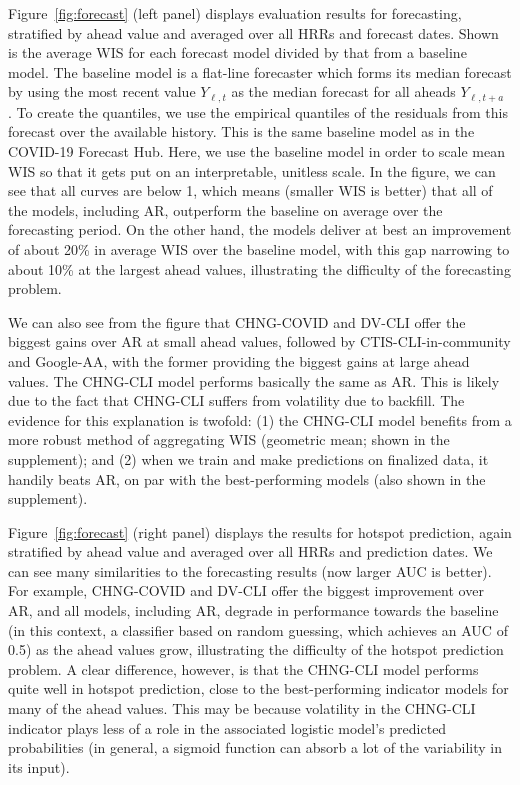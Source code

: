 \documentclass[9pt,twocolumn,twoside,lineno]{pnas-new}
\begin{document}
Figure~\ref{fig:forecast} (left panel) displays evaluation results for
forecasting, stratified by ahead value and averaged over all HRRs and forecast
dates.  Shown is the average WIS for each forecast model divided by that from a
baseline model.
The baseline model is a flat-line forecaster which forms its median forecast by
using the most recent value $Y_{\ell,t}$ as the median forecast for all aheads
$Y_{\ell,t+a}$ . To create
the quantiles, we use the empirical quantiles of the residuals from this
forecast over the available history. 
This is the same baseline model as
in the COVID-19 Forecast Hub. Here, we use the baseline model in order to scale
mean WIS so that it gets put on an interpretable, unitless scale.  In the
figure, we can see that all curves are below 1, which means (smaller WIS is
better) that all of the models, including AR, outperform the baseline on average
over the forecasting period.  On the other hand, the models deliver at best an
improvement of about 20\% in average WIS over the baseline model, with this gap
narrowing to about 10\% at the largest ahead values, illustrating the difficulty 
of the forecasting problem.

We can also see from the figure that CHNG-COVID and DV-CLI offer the biggest
gains over AR at small ahead values, followed by CTIS-CLI-in-community and
Google-AA, with the former providing the biggest gains at large ahead values.
The CHNG-CLI model performs basically the same as AR.  This is likely due to the
fact that CHNG-CLI suffers from volatility due to backfill.  The evidence for
this explanation is twofold: (1) the CHNG-CLI model benefits from a more robust
method of aggregating WIS (geometric mean; shown in the supplement); and (2)
when we train and make predictions on finalized data, it handily beats AR, on
par with the best-performing models (also shown in the supplement).  

Figure~\ref{fig:forecast} (right panel) displays the results for hotspot
prediction, again stratified by ahead value and averaged over all HRRs and
prediction dates.  We can see many similarities to the forecasting results (now
larger AUC is better). For example, CHNG-COVID and DV-CLI offer the biggest
improvement over AR, and all models, including AR, degrade in performance
towards the baseline (in this context, a classifier based on random guessing,
which achieves an AUC of 0.5) as the ahead values grow, illustrating the
difficulty of the hotspot prediction problem. A clear difference, however, is
that the CHNG-CLI model performs quite well in hotspot prediction, close to the
best-performing indicator models for many of the ahead values. This may be
because volatility in the CHNG-CLI indicator plays less of a role in the
associated logistic model's predicted probabilities (in general, a sigmoid
function can absorb a lot of the variability in its input).
\end{document}
